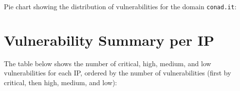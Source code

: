 \documentclass{article}
\begin{document}
\noindent Pie chart showing the distribution of vulnerabilities for the domain \texttt{conad.it}:

\begin{figure}[H]
    \centering
\end{figure}

\section*{Vulnerability Summary per IP}

\noindent The table below shows the number of critical, high, medium, and low vulnerabilities for each IP, ordered by the number of vulnerabilities (first by critical, then high, medium, and low):
\end{document}
